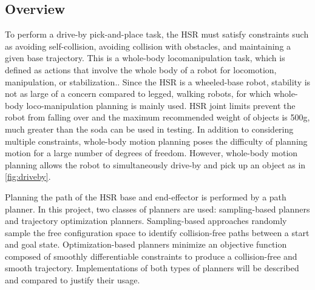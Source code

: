 \documentclass[12pt]{article}
\begin{document}
    \subsection{Overview}

        To perform a drive-by pick-and-place task, the HSR must satisfy constraints such as avoiding self-collision, avoiding collision with obstacles, and maintaining a given base trajectory. This is a whole-body locomanipulation task, which is defined as actions that involve the whole body of a robot for locomotion, manipulation, or stabilization.\cite{kaiser_validation_2015}. Since the HSR is a wheeled-base robot, stability is not as large of a concern compared to legged, walking robots, for which whole-body loco-manipulation planning is mainly used. HSR joint limits prevent the robot from falling over and the maximum recommended weight of objects is 500g, much greater than the soda can be used in testing.\cite{noauthor_hsrb_manual_nodate} In addition to considering multiple constraints, whole-body motion planning poses the difficulty of planning motion for a large number of degrees of freedom. However, whole-body motion planning allows the robot to simultaneously drive-by and pick up an object as in \cref{fig:driveby}.
        \par Planning the path of the HSR base and end-effector is performed by a path planner. In this project, two classes of planners are used: sampling-based planners and trajectory optimization planners. Sampling-based approaches randomly sample the free configuration space to identify collision-free paths between a start and goal state. Optimization-based planners minimize an objective function composed of smoothly differentiable constraints to produce a collision-free and smooth trajectory. Implementations of both types of planners will be described and compared to justify their usage.
    
\end{document}

